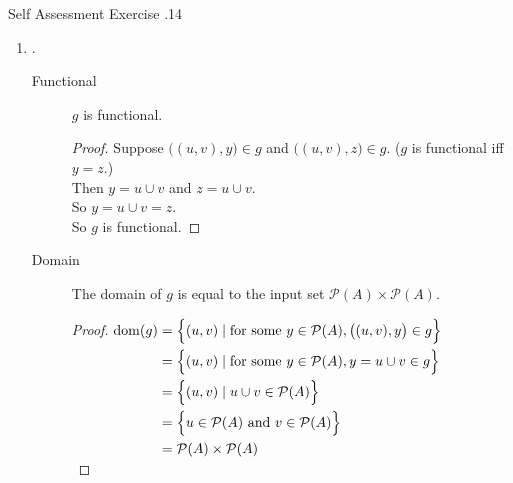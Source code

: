 \documentclass[\main/notes.tex]{subfiles}
\begin{document}
\begin{exercise}{Self Assessment Exercise \thechapter.14}
\begin{enumerate}
\begin{enumerate}[label=(\alph*)]
\begin{description}
											\begin{proof} $
												\begin{aligned}[t]
													\mathrm{dom}(f) &= \{x \mid \text{for some } y \in \mathcal{P}(A), (x, y) \in f\}\\
													&= \{x \mid \text{for some } y \in \mathcal{P}(A), y = x'\}\\
													&= \{x \mid x' \in \mathcal{P}(A)\}\\
													&= \mathcal{P}(A)
												\end{aligned} $\\
												Therefore $\mathrm{dom}(f)$ is equal to the input set.
											\end{proof}
									\end{description}
								\item {}.
									\begin{description}
										\item[Functional] $g$ is functional.
											\begin{proof}
												Suppose $\bigl((u, v), y\bigr) \in g$ and $\bigl((u, v), z\bigr) \in g$. ($g$ is functional iff $y = z$.)\\
												Then $y = u \cup v$ and $z = u \cup v$.\\
												So $y = u \cup v = z$.\\
												So $g$ is functional.
											\end{proof}
										\item[Domain] The domain of $g$ is equal to the input set $\mathcal{P}(A) \times \mathcal{P}(A)$.
											\begin{proof} $
												\begin{aligned}[t]
													\mathrm{dom}(g) &= \Bigl\{(u, v) \mid \text{for some } y \in \mathcal{P}(A), \bigl((u, v), y\bigr) \in g\Bigr\}\\
													&= \Bigl\{(u, v) \mid \text{for some } y \in \mathcal{P}(A), y = u \cup v \in g\Bigr\}\\
													&= \Bigl\{(u, v) \mid u \cup v \in \mathcal{P}(A)\Bigr\}\\
													&= \Bigl\{u \in \mathcal{P}(A) \text{ and } v \in \mathcal{P}(A)\Bigr\}\\
													&= \mathcal{P}(A) \times \mathcal{P}(A)
												\end{aligned} $\\

\end{proof}
\end{description}
\end{enumerate}
\end{enumerate}
\end{exercise}
\end{document}
